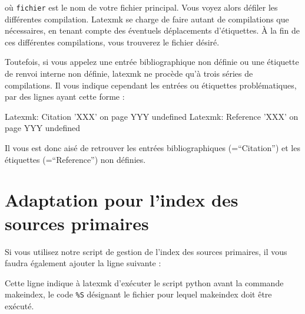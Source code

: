 où \verb|fichier| est le nom de votre fichier principal. Vous voyez alors défiler les différentes compilation. Latexmk se charge de faire autant de compilations que nécessaires, en tenant compte des éventuels déplacements d'étiquettes. À la fin de ces différentes compilations, vous trouverez le fichier  désiré.

Toutefois, si vous appelez une entrée bibliographique non définie ou une étiquette de renvoi interne non définie, latexmk ne procède qu'à trois séries de compilations. Il vous indique cependant les entrées ou étiquettes problématiques, par des lignes ayant cette forme :
\begin{bashcode}
Latexmk: Citation 'XXX' on page YYY undefined 
Latexmk: Reference 'XXX' on page YYY undefined 
\end{bashcode}

Il vous est donc aisé de retrouver les entrées bibliographiques (=\enquote{Citation}) et les étiquettes (=\enquote{Reference}) non définies.

\section{Adaptation pour l'index des sources primaires}

Si vous utilisez notre script de gestion de l'index des sources primaires, il vous faudra également ajouter la ligne suivante :

Cette ligne indique à latexmk d'exécuter le script python avant la commande makeindex, le code \verb|%S| désignant le fichier pour lequel makeindex doit être exécuté.

